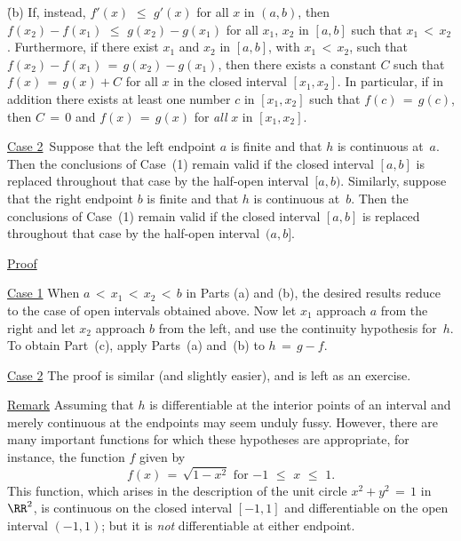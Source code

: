\V

        \h (b) If, instead, $f'(x)\,\,{\leq}\,\,g'(x)$ for all $x$ in $(a,b)$, then $f(x_{2})-f(x_{1})\,\,{\leq}\,\,g(x_{2})-g(x_{1})$
    for all $x_{1}$, $x_{2}$ in $[a,b]$ such that $x_{1}\,<\,x_{2}$. Furthermore, if there exist $x_{1}$ and $x_{2}$ in $[a,b]$,
    with $x_{1}\,<\,x_{2}$, such that $f(x_{2}) - f(x_{1}) \,=\, g(x_{2}) - g(x_{1})$,
    then there exists a constant $C$ such that $f(x) \,=\, g(x)+C$ for all $x$ in the closed interval $[x_{1},x_{2}]$.
    In particular, if in addition there exists at least one number $c$ in $[x_{1},x_{2}]$ such that $f(c) \,=\, g(c)$,
    then $C \,=\, 0$ and $f(x) \,=\, g(x)$ for {\em all} $x$ in $[x_{1},x_{2}]$.

\V

        \underline{Case 2}\, Suppose that the left endpoint $a$ is finite and that $h$ is continuous at~$a$.
    Then the conclusions of Case~(1) remain valid if the closed interval $[a,b]$ is replaced throughout that case by the half-open interval~$[a,b)$.
    Similarly, suppose that the right endpoint $b$ is finite and that $h$ is continuous at~$b$.
    Then the conclusions of Case~(1) remain valid if the closed interval $[a,b]$ is replaced throughout that case by the half-open interval~$(a,b]$.

\V

        \underline{Proof}

\V

        \underline{Case 1} When $a\,<\,x_{1}\,<\,x_{2}\,<\,b$ in Parts (a) and (b), the desired results reduce to the case of open intervals obtained above.
    Now let $x_{1}$ approach $a$ from the right and let $x_{2}$ approach $b$ from the left, and use the continuity hypothesis for~$h$.
    To obtain Part~(c), apply Parts~(a) and~(b) to $h \,=\, g-f$.

\V

        \underline{Case 2} The proof is similar (and slightly easier), and is left as an exercise. \Q

\V

        \underline{Remark} Assuming that $h$ is differentiable at the interior points of an interval and merely continuous at the endpoints may seem unduly fussy.
    However, there are many important functions for which these hypotheses are appropriate, for instance, the function $f$ given by
        \begin{displaymath}
        f(x) \,=\, \sqrt{1-x^{2}} \mbox{ for $-1\,\,{\leq}\,\,x\,\,{\leq}\,\,1$}.
        \end{displaymath}
    This function, which arises in the description of the unit circle $x^{2}+y^{2} \,=\, 1$ in ${\RR}^{2}$,
    is continuous on the closed interval $[-1,1]$ and differentiable on the open interval $(-1,1)$; but it is {\em not} differentiable at either endpoint.

